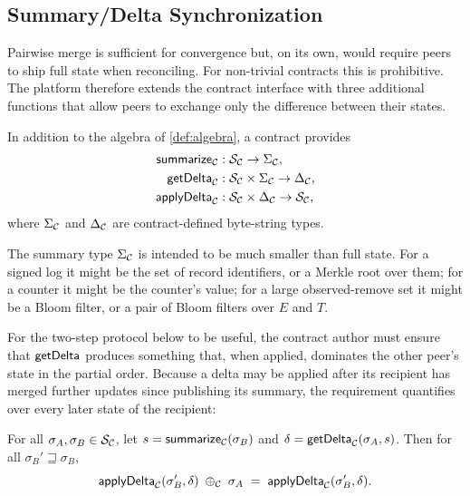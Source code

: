 \subsection{Summary/Delta Synchronization}

Pairwise merge is sufficient for convergence but, on its own, would require peers to ship full state when reconciling. For non-trivial contracts this is prohibitive. The platform therefore extends the contract interface with three additional functions that allow peers to exchange only the difference between their states.

\begin{definition}
\label{def:sync}
In addition to the algebra of \cref{def:algebra}, a contract provides
\begin{align*}
  \mathsf{summarize}_{\mathcal{C}} &: \mathcal{S}_{\mathcal{C}} \to \Sigma_{\mathcal{C}},\\
  \mathsf{getDelta}_{\mathcal{C}} &: \mathcal{S}_{\mathcal{C}} \times \Sigma_{\mathcal{C}} \to \Delta_{\mathcal{C}},\\
  \mathsf{applyDelta}_{\mathcal{C}} &: \mathcal{S}_{\mathcal{C}} \times \Delta_{\mathcal{C}} \to \mathcal{S}_{\mathcal{C}},
\end{align*}
where $\Sigma_{\mathcal{C}}$ and $\Delta_{\mathcal{C}}$ are contract-defined byte-string types.
\end{definition}

The summary type $\Sigma_{\mathcal{C}}$ is intended to be much smaller than full state. For a signed log it might be the set of record identifiers, or a Merkle root over them; for a counter it might be the counter's value; for a large observed-remove set it might be a Bloom filter, or a pair of Bloom filters over $E$ and $T$.

For the two-step protocol below to be useful, the contract author must ensure that $\mathsf{getDelta}$ produces something that, when applied, dominates the other peer's state in the partial order. Because a delta may be applied after its recipient has merged further updates since publishing its summary, the requirement quantifies over every later state of the recipient:

\begin{property}
\label{prop:sync}
For all $\sigma_A, \sigma_B \in \mathcal{S}_{\mathcal{C}}$, let $s = \mathsf{summarize}_{\mathcal{C}}(\sigma_B)$ and $\delta = \mathsf{getDelta}_{\mathcal{C}}(\sigma_A, s)$. Then for all $\sigma_B' \sqsupseteq \sigma_B$,
\[
  \mathsf{applyDelta}_{\mathcal{C}}(\sigma_B', \delta) \;\oplus_{\mathcal{C}}\; \sigma_A
  \;=\;
  \mathsf{applyDelta}_{\mathcal{C}}(\sigma_B', \delta).
\]
\end{property}

